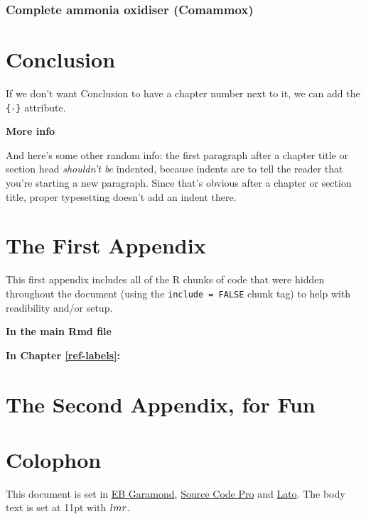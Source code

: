 \documentclass[twoside,12pt,final]{ucthesis-CA2012}
\begin{document}
\begin{ucmainmatter}
\hypertarget{complete-ammonia-oxidiser-comammox}{%
\subsection{Complete ammonia oxidiser (Comammox)}\label{complete-ammonia-oxidiser-comammox}}

\hypertarget{conclusion}{%
\chapter*{Conclusion}\label{conclusion}}

If we don't want Conclusion to have a chapter number next to it, we can add the \texttt{\{-\}} attribute.

\textbf{More info}

And here's some other random info: the first paragraph after a chapter title or section head \emph{shouldn't be} indented, because indents are to tell the reader that you're starting a new paragraph. Since that's obvious after a chapter or section title, proper typesetting doesn't add an indent there.

\appendix

\hypertarget{the-first-appendix}{%
\chapter{The First Appendix}\label{the-first-appendix}}

This first appendix includes all of the R chunks of code that were hidden throughout the document (using the \texttt{include\ =\ FALSE} chunk tag) to help with readibility and/or setup.

\textbf{In the main Rmd file}

\textbf{In Chapter \ref{ref-labels}:}

\hypertarget{the-second-appendix-for-fun}{%
\chapter{The Second Appendix, for Fun}\label{the-second-appendix-for-fun}}

\hypertarget{colophon}{%
\chapter*{Colophon}\label{colophon}}

This document is set in \href{https://github.com/georgd/EB-Garamond}{EB Garamond}, \href{https://github.com/adobe-fonts/source-code-pro/}{Source Code Pro} and \href{http://www.latofonts.com/lato-free-fonts/}{Lato}. The body text is set at 11pt with \(\familydefault\).


\end{ucmainmatter}
\end{document}
